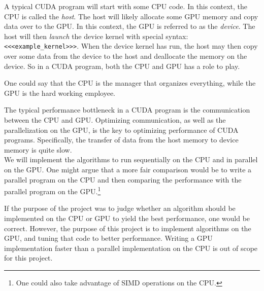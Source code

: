 \noindent A typical CUDA program will start with some CPU code. In this context, the CPU is called the \textit{host}. The host will likely allocate some GPU memory and copy data over to the GPU. In this context, the GPU is referred to as the \textit{device}. The host will then \textit{launch} the device kernel with special syntax: \texttt{<<<example\_kernel>>>}. When the device kernel has run, the host may then copy over some data from the device to the host and deallocate the memory on the device. So in a CUDA program, both the CPU and GPU has a role to play. 

One could say that the CPU is the manager that organizes everything, while the GPU is the hard working employee.

The typical performance bottleneck in a CUDA program is the communication between the CPU and GPU. Optimizing communication, as well as the parallelization on the GPU, is the key to optimizing performance of CUDA programs. Specifically, the transfer of data from the host memory to device memory is quite slow.\cite[Sect. 5.3.1]{nvidia:cudadoc}\\

\noindent We will implement the algorithms to run sequentially on the CPU and in parallel on the GPU. One might argue that a more fair comparison would be to write a parallel program on the CPU and then comparing the performance with the parallel program on the GPU.\footnote{One could also take advantage of SIMD operations on the CPU.}

If the purpose of the project was to judge whether an algorithm should be implemented on the CPU or GPU to yield the best performance, one would be correct. However, the purpose of this project is to implement algorithms on the GPU, and tuning that code to better performance. Writing a GPU implementation faster than a parallel implementation on the CPU is out of scope for this project.
% 

